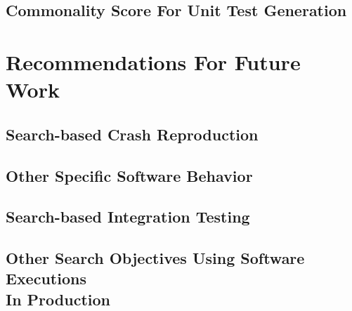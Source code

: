 \subsection{Commonality Score For Unit Test Generation}

\section{Recommendations For Future Work}

\subsection{Search-based Crash Reproduction}


\subsection{Other Specific Software Behavior}

\subsection{Search-based Integration Testing}


\subsection{Other Search Objectives Using Software Executions\\ In Production}